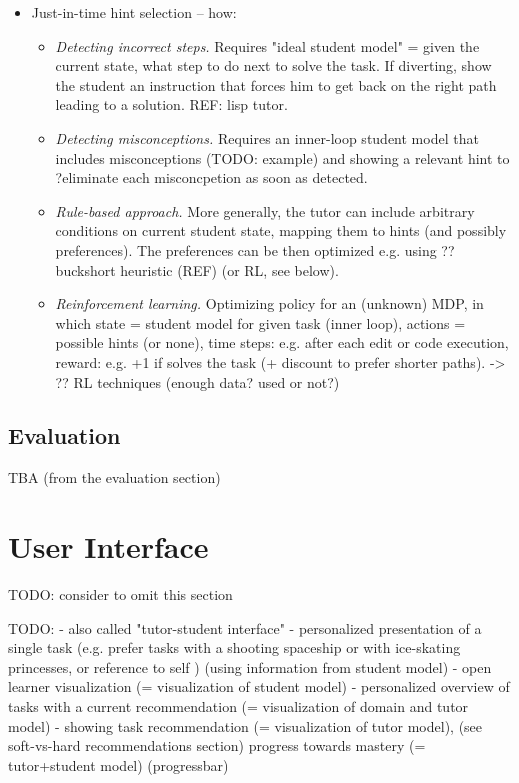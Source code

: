 \begin{itemize}
\item Just-in-time hint selection -- how:
\begin{itemize}
\item \emph{Detecting incorrect steps.}
  Requires "ideal student model" = given the current state, what step to do
  next to solve the task.
  If diverting, show the student an instruction that forces him to get back on
  the right path leading to a solution.
  REF: lisp tutor.
\item \emph{Detecting misconceptions.}
  Requires an inner-loop student model that includes misconceptions (TODO: example)
  and showing a relevant hint to ?eliminate each misconcpetion as soon as detected.
\item \emph{Rule-based approach.}
  More generally, the tutor can include arbitrary conditions on current student state,
  mapping them to hints (and possibly preferences).
  The preferences can be then optimized e.g. using ?? buckshort heuristic (REF) (or RL, see below).
\item \emph{Reinforcement learning.}
  Optimizing policy for an (unknown) MDP, in which
  state = student model for given task (inner loop),
  actions = possible hints (or none),
  time steps: e.g. after each edit or code execution,
  reward: e.g. +1 if solves the task (+ discount to prefer shorter paths).
  -> ?? RL techniques (enough data? used or not?)
\end{itemize}
\end{itemize}


\subsection{Evaluation}

TBA (from the evaluation section)





\section{User Interface}

TODO: consider to omit this section

TODO:
- also called "tutor-student interface"
- personalized presentation of a single task
(e.g. prefer tasks with a shooting spaceship or with ice-skating princesses,
or reference to self \cite[chapter 9]{its-domain-models})
(using information from student model)
- open learner visualization (= visualization of student model)
- personalized overview of tasks with a current recommendation (= visualization
of domain and tutor model)
- showing task recommendation (= visualization of tutor model),
  (see soft-vs-hard recommendations section)
  progress towards mastery (= tutor+student model)
  (progressbar)

